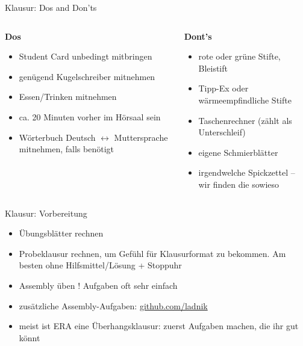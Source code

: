 \documentclass[
  german,            %
  aspectratio=169,    %
]{tumbeamer}
\newcommand{\cmark}{\ding{51}}%
\newcommand{\xmark}{\ding{55}}%
\begin{document}
\begin{frame}[c]{Klausur: Dos and Don'ts}{}
	\begin{columns}[c]
		\begin{column}{0.5\textwidth}
			\centering \textbf{Dos} \textcolor{green}{\cmark}
			\vspace{\baselineskip}
			\begin{itemize}
				\item Student Card unbedingt mitbringen
				\item genügend Kugelschreiber mitnehmen
				\item Essen/Trinken mitnehmen
				\item ca. 20 Minuten vorher im Hörsaal sein
				\item Wörterbuch Deutsch $\leftrightarrow$ Muttersprache mitnehmen, falls benötigt
			\end{itemize}
		\end{column}
		\begin{column}{0.5\textwidth}
			\centering \textbf{Dont's} \textcolor{red}{\xmark}
			\vspace{\baselineskip}
			\begin{itemize}
				\item rote oder grüne Stifte, Bleistift
				\item Tipp-Ex oder wärmeempfindliche Stifte
				\item Taschenrechner (zählt als Unterschleif)
				\item eigene Schmierblätter
				\item irgendwelche Spickzettel -- wir finden die sowieso
			\end{itemize}
		\end{column}
	\end{columns}
\end{frame}

\begin{frame}[c]{Klausur: Vorbereitung}{}
	\begin{itemize}
		\item Übungsblätter rechnen
		\item Probeklausur rechnen, um Gefühl für Klausurformat zu bekommen. Am besten ohne Hilfsmittel/Lösung + Stoppuhr
		\item Assembly üben	! Aufgaben oft sehr einfach
		\item zusätzliche Assembly-Aufgaben: \href{https://github.com/ladnik/RISC-V-Assembly-Introductory-Exercises}{github.com/ladnik}
		\item meist ist ERA eine Überhangsklausur: zuerst Aufgaben machen, die ihr gut könnt
	\end{itemize}
\end{frame}
\end{document}
